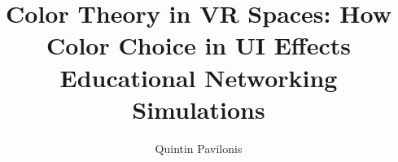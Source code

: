 \documentclass[acmlarge]{acmart}
\begin{document}
\title{Color Theory in VR Spaces: How Color Choice in UI Effects Educational Networking Simulations}

\author{Quintin Pavilonis}

\renewcommand{\shortauthors}{Pavilonis}
\end{document}
